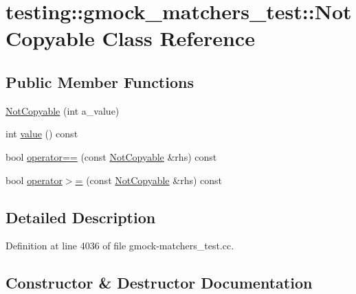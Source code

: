 \hypertarget{classtesting_1_1gmock__matchers__test_1_1_not_copyable}{}\section{testing\+:\+:gmock\+\_\+matchers\+\_\+test\+:\+:Not\+Copyable Class Reference}
\label{classtesting_1_1gmock__matchers__test_1_1_not_copyable}
\subsection*{Public Member Functions}
\begin{DoxyCompactItemize}
\item 
\hyperlink{classtesting_1_1gmock__matchers__test_1_1_not_copyable_a3d15763c115415a26d8acc9ce5a26e19}{Not\+Copyable} (int a\+\_\+value)
\item 
int \hyperlink{classtesting_1_1gmock__matchers__test_1_1_not_copyable_af9bbae9c639a552fa1c93cf59624c363}{value} () const 
\item 
bool \hyperlink{classtesting_1_1gmock__matchers__test_1_1_not_copyable_a7541c38c67ee7c16d87c9c49f81622cd}{operator==} (const \hyperlink{classtesting_1_1gmock__matchers__test_1_1_not_copyable}{Not\+Copyable} \&rhs) const 
\item 
bool \hyperlink{classtesting_1_1gmock__matchers__test_1_1_not_copyable_afaf21e12942ea53d8e255ae4b8eab0f7}{operator$>$=} (const \hyperlink{classtesting_1_1gmock__matchers__test_1_1_not_copyable}{Not\+Copyable} \&rhs) const 
\end{DoxyCompactItemize}


\subsection{Detailed Description}


Definition at line 4036 of file gmock-\/matchers\+\_\+test.\+cc.



\subsection{Constructor \& Destructor Documentation}
